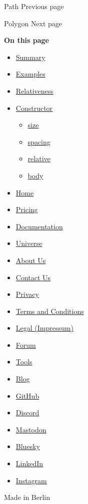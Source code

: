 { Path } { Previous page }

\href{/docs/reference/visualize/polygon/}{\pandocbounded{}}

{ Polygon } { Next page }

\textbf{On this page}

\begin{itemize}
\tightlist
\item
  \hyperref[summary]{Summary}
\item
  \hyperref[examples]{Examples}
\item
  \hyperref[relativeness]{Relativeness}
\item
  \hyperref[constructor]{Constructor}

  \begin{itemize}
  \tightlist
  \item
    \hyperref[constructor-size]{size}
  \item
    \hyperref[constructor-spacing]{spacing}
  \item
    \hyperref[constructor-relative]{relative}
  \item
    \hyperref[constructor-body]{body}
  \end{itemize}
\end{itemize}

\begin{itemize}
\tightlist
\item
  \href{/}{Home}
\item
  \href{/pricing/}{Pricing}
\item
  \href{/docs/}{Documentation}
\item
  \href{/universe/}{Universe}
\item
  \href{/about/}{About Us}
\item
  \href{/contact/}{Contact Us}
\item
  \href{/privacy/}{Privacy}
\item
  \href{https://typst.app/terms}{Terms and Conditions}
\item
  \href{/legal/}{Legal (Impressum)}
\end{itemize}

\begin{itemize}
\tightlist
\item
  \href{https://forum.typst.app}{Forum}
\item
  \href{/tools/}{Tools}
\item
  \href{/blog/}{Blog}
\item
  \href{https://github.com/typst/}{GitHub}
\item
  \href{https://discord.gg/2uDybryKPe}{Discord}
\item
  \href{https://mastodon.social/@typst}{Mastodon}
\item
  \href{https://bsky.app/profile/typst.app}{Bluesky}
\item
  \href{https://www.linkedin.com/company/typst/}{LinkedIn}
\item
  \href{https://instagram.com/typstapp/}{Instagram}
\end{itemize}

Made in Berlin
